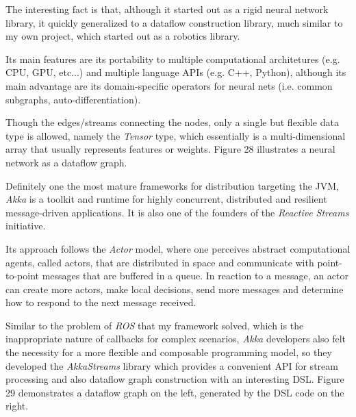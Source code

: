 \documentclass{dithesis}
\begin{document}
The interesting fact is that, although it started out as a rigid neural network library, it quickly generalized to a dataflow construction library, much similar to my own project, which started out as a robotics library. 

Its main features are its portability to multiple computational architetures (e.g. CPU, GPU, etc...) and multiple language APIs (e.g. C++, Python), although its main advantage are its domain-specific operators for neural nets (i.e. common subgraphs, auto-differentiation).

Though the edges/streams connecting the nodes, only a single but flexible data type is allowed, namely the \textit{Tensor} type, which essentially is a multi-dimensional array that usually represents features or weights. Figure 28 illustrates a neural network as a dataflow graph.



Definitely one the most mature frameworks for distribution targeting the JVM, \textit{Akka} is a toolkit and runtime for highly concurrent, distributed and resilient message-driven applications. It is also one of the founders of the \textit{Reactive Streams}\cite{rss} initiative.

Its approach follows the \textit{Actor} model\cite{actor}, where one perceives abstract computational agents, called actors, that are distributed in space and communicate with point-to-point messages that are buffered in a queue. In reaction to a message, an actor can create more actors, make local decisions, send more messages and determine how to respond to the next message received.

Similar to the problem of \textit{ROS} that my framework solved, which is the inappropriate nature of callbacks for complex scenarios, \textit{Akka} developers also felt the necessity for a more flexible and composable programming model, so they developed the \textit{AkkaStreams} library which provides a convenient API for stream processing and also dataflow graph construction with an interesting DSL. Figure 29 demonstrates a dataflow graph on the left, generated by the DSL code on the right.


\end{document}
